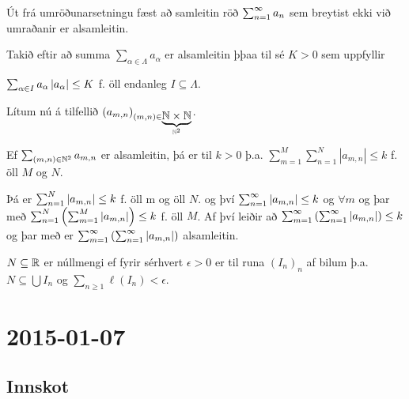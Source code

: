 \documentclass[12pt]{report}
\begin{document}
\begin{ath} Út frá umröðunarsetningu fæst að samleitin röð
  $\sum_{n = 1}^{\infty} a_n$ sem breytist ekki við umraðanir er alsamleitin.

  { \def\aal{a_{\alpha}} \def\aall{(\aal)_{\alpha \in \Lambda}}
    \def\saal{\sum_{\alpha \in \Lambda} a_{\alpha}}

    \newcommand{\sal}[1]{\sum_{\alpha \in #1} a_{\alpha } }

    Takið eftir að summa $\saal$ er alsamleitin þþaa til sé $ K > 0$
    sem uppfyllir

    $\sal{I} \abs{\aal} \leq K$ f. öll endanleg $I \subseteq \Lambda$.

    \def\mn{(m,n)} \def\amn{a_{m,n}} Lítum nú á tilfellið
    $(\amn)_{\mn \in \underbrace{\N \times \N}_{\N^2}}$.

    Ef $\sum_{\mn \in \N^2} \amn$ er alsamleitin, þá er til $k > 0$
    þ.a.  $\sum_{m=1}^M \sum_{n=1}^N | \amn| \leq k$ f. öll $M$ og
    $N$.

    Þá er $\sum_{n=1}^N \abs{\amn} \leq k$ f. öll m og öll $N$. og því
    $\sumoinfty \abs{\amn} \leq k$ og $\forall m$ og þar með
    $\sum_{n=1}^N \left(\sum_{m=1}^M \abs{\amn}\right) \leq k$ f. öll
    $M$. Af því leiðir að
    $\sum_{m=1}^{\infty} \left( \sumoinfty \abs{\amn} \right) \leq k$
    og þar með er
    $\sum_{m=1}^{\infty} \left( \sumoinfty \abs{\amn} \right)$
    alsamleitin.  }

\end{ath}

\begin{ath}
  $N \subseteq \mathbb{R}$ er núllmengi ef fyrir sérhvert $\epsilon > 0$ er
  til runa $(I_n)_{n}$ af bilum þ.a.  $N \subseteq \bigcup I_n$ og
  $\sum_{n \geq 1} \ell(I_n) < \epsilon$.

\end{ath}
\chapter{2015-01-07}

\section*{Innskot}
\end{document}
